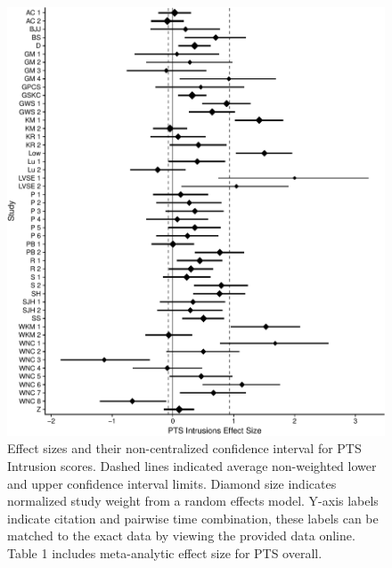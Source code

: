 \documentclass[man, mask]{apa6}
\theoremstyle{definition}
\theoremstyle{definition}
\theoremstyle{definition}
\theoremstyle{remark}
\begin{document}
\begin{figure}[htbp]
\centering
\includegraphics{meta_markdown_files/figure-latex/ptspicint-1.pdf}
\caption{\label{fig:ptspicint}Effect sizes and their non-centralized
confidence interval for PTS Intrusion scores. Dashed lines indicated
average non-weighted lower and upper confidence interval limits. Diamond
size indicates normalized study weight from a random effects model.
Y-axis labels indicate citation and pairwise time combination, these
labels can be matched to the exact data by viewing the provided data
online. Table 1 includes meta-analytic effect size for PTS overall.}
\end{figure}
\end{document}

